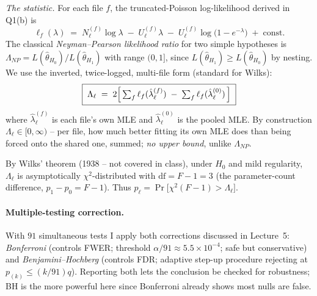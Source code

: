 \documentclass[11pt,a4paper]{article}
\newcommand{\hlam}{\hat{\lambda}}
\begin{document}
\emph{The statistic.} For each file $f$, the truncated-Poisson log-likelihood derived
in Q1(b) is
\[
   \ell_f(\lambda) \;=\; N_\ell^{(f)} \log \lambda \;-\; U_\ell^{(f)} \lambda
                       \;-\; U_\ell^{(f)} \log\!\bigl(1 - e^{-\lambda}\bigr) \;+\; \text{const.}
\]
The classical \emph{Neyman--Pearson likelihood ratio} for two simple hypotheses
is $\Lambda_{NP} = L(\hat\theta_{H_0}) / L(\hat\theta_{H_1})$ with range
$(0, 1]$, since $L(\hat\theta_{H_1}) \ge L(\hat\theta_{H_0})$ by nesting. We
use the inverted, twice-logged, multi-file form (standard for Wilks):
\[
   \boxed{\;\Lambda_\ell \;=\; 2\Bigl[\, \textstyle\sum_f \ell_f(\hlam_\ell^{(f)}) \;-\; \sum_f \ell_f(\hlam_\ell^{(0)}) \,\Bigr]\;}
\]
where $\hlam_\ell^{(f)}$ is each file's own MLE and $\hlam_\ell^{(0)}$ is the
pooled MLE. By construction $\Lambda_\ell \in [0, \infty)$ -- per file, how
much better fitting its own MLE does than being forced onto the shared one,
summed; \emph{no upper bound}, unlike $\Lambda_{NP}$.

By Wilks' theorem (1938 -- not covered in class), under $H_0$ and mild
regularity, $\Lambda_\ell$ is asymptotically $\chi^{2}$-distributed with
$\mathrm{df} = F - 1 = 3$ (the parameter-count difference, $p_1 - p_0 = F - 1$).
Thus $p_\ell = \Pr\bigl[\chi^{2}(F-1) > \Lambda_\ell\bigr]$.

\paragraph{Multiple-testing correction.}
With $91$ simultaneous tests I apply both corrections discussed in Lecture~5:
\emph{Bonferroni} (controls FWER; threshold $\alpha/91 \approx 5.5\times 10^{-4}$;
safe but conservative) and \emph{Benjamini--Hochberg} (controls FDR; adaptive
step-up procedure rejecting at $p_{(k)} \le (k/91)q$). Reporting both lets the
conclusion be checked for robustness; BH is the more powerful here since
Bonferroni already shows most nulls are false.
\end{document}
